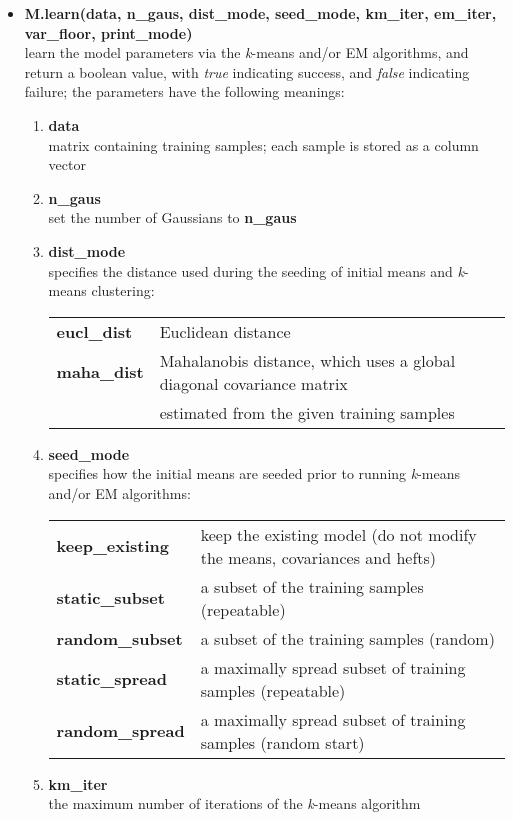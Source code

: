 \begin{small}
\begin{itemize}
\item
{\bf M.learn(data, n\_gaus, dist\_mode, seed\_mode, km\_iter, em\_iter, var\_floor, print\_mode)}\\
learn the model parameters via the {\it k}-means and/or EM algorithms,
and return a boolean value, with {\it true} indicating success, and {\it false} indicating failure;
the parameters have the following meanings:

\begin{enumerate}[{$\cdot$}]
\item
{\bf data}\\
matrix containing training samples; each sample is stored as a column vector

\item
{\bf n\_gaus}\\
set the number of Gaussians to {\bf n\_gaus}

\item
{\bf dist\_mode}\\
specifies the distance used during the seeding of initial means and {\it k}-means clustering:

\begin{tabular}{ll}
{\bf eucl\_dist} & Euclidean distance\\
{\bf maha\_dist} & Mahalanobis distance, which uses a global diagonal covariance matrix\\
                 & estimated from the given training samples
\end{tabular}

\item
{\bf seed\_mode}\\
specifies how the initial means are seeded prior to running {\it k}-means and/or EM algorithms:

\begin{tabular}{ll}
{\bf keep\_existing} & keep the existing model (do not modify the means, covariances and hefts) \\
{\bf static\_subset} & a subset of the training samples (repeatable) \\
{\bf random\_subset} & a subset of the training samples (random) \\
{\bf static\_spread} & a maximally spread subset of training samples (repeatable) \\
{\bf random\_spread} & a maximally spread subset of training samples (random start)
\end{tabular}

\item
{\bf km\_iter}\\
the maximum number of iterations of the {\it k}-means algorithm


\end{enumerate}
\end{itemize}
\end{small}
